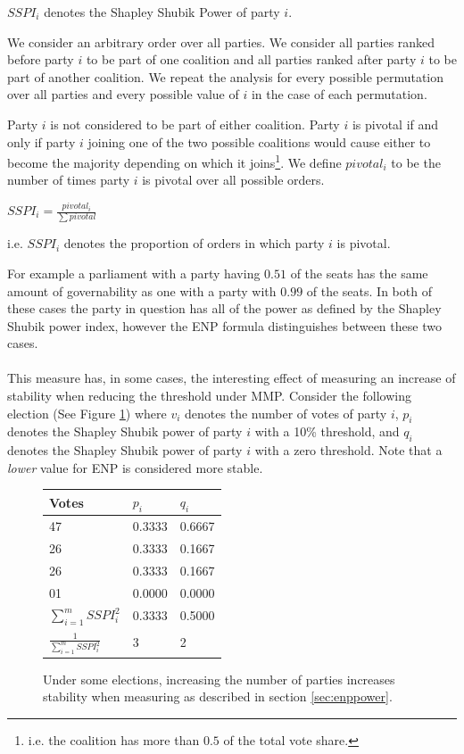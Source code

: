 \documentclass{article}
\begin{document}
$SSPI_i$ denotes the Shapley Shubik Power of party $i$.

We consider an arbitrary order over all parties. We consider all parties ranked before party $i$ to be part of one coalition and all parties ranked after party $i$ to be part of another coalition. We repeat the analysis for every possible permutation over all parties and every possible value of $i$ in the case of each permutation.

Party $i$ is not considered to be part of either coalition. Party $i$ is pivotal if and only if party $i$ joining one of the two possible coalitions would cause either to become the majority depending on which it joins\footnote{i.e. the coalition has more than $0.5$ of the total vote share.}. We define $pivotal_i$ to be the number of times party $i$ is pivotal over all possible orders.

$SSPI_i = \frac{pivotal_i}{\sum pivotal}$ \cite{shapleyshubik}

i.e. $SSPI_i$ denotes the proportion of orders in which party $i$ is pivotal.

For example a parliament with a party having $0.51$ of the seats has the same amount of governability as one with a party with $0.99$ of the seats. In both of these cases the party in question has all of the power as defined by the Shapley Shubik power index, however the ENP formula distinguishes between these two cases.

\paragraph{}
This measure has, in some cases, the interesting effect of measuring an increase of stability when reducing the threshold under MMP. Consider the following election (See Figure \ref{tab:shapleyshubikpower}) where $v_i$ denotes the number of votes of party $i$, $p_i$ denotes the Shapley Shubik power of party $i$ with a 10\% threshold, and $q_i$ denotes the Shapley Shubik power of party $i$ with a zero threshold. Note that a \emph{lower}  value for ENP is considered more stable.

\begin{figure}[h!b]
\begin{tabular}{l l l }
\hline
Votes & $p_i$ & $q_i$ \\ \hline
47 & 0.3333 & 0.6667 \\
26 & 0.3333 & 0.1667  \\
26 & 0.3333 & 0.1667  \\
01 & 0.0000 & 0.0000 \\ \hline
$\sum_{i=1}^m SSPI_i^2$ & 0.3333 & 0.5000 \\
$\frac{1}{\sum_{i=1}^m SSPI_i^2}$ & 3 & 2 \\
\hline
\end{tabular}

\caption{Under some elections, increasing the number of parties increases stability when measuring as described in section \ref{sec:enppower}.}
\label{tab:shapleyshubikpower}
\end{figure}
\end{document}
